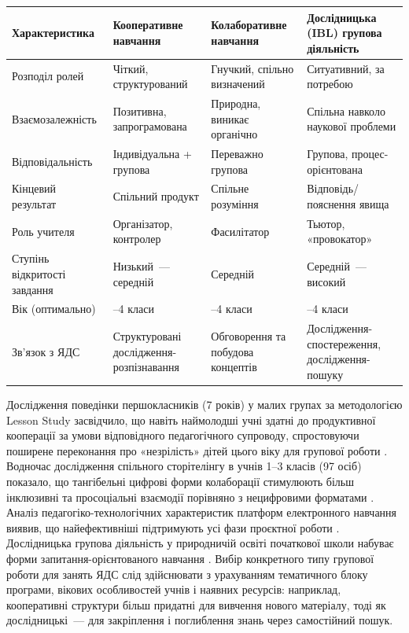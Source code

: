 \documentclass[a4paper,14pt]{extarticle}
\begin{document}
\begin{center}
\label{tab:2.1}
\begin{longtable}{|>{\raggedright\arraybackslash}p{2.8cm}|
                    >{\raggedright\arraybackslash}p{3cm}|
                    >{\raggedright\arraybackslash}p{3.2cm}|
                    >{\raggedright\arraybackslash}p{3.2cm}|}
\hline
\textbf{Характеристика} &
\textbf{Кооперативне навчання} &
\textbf{Колаборативне навчання} &
\textbf{Дослідницька (IBL) групова діяльність} \\
\hline
Розподіл ролей & Чіткий, структурований & Гнучкий, спільно визначений & Ситуативний, за потребою \\
\hline
Взаємозалежність & Позитивна, запрограмована & Природна, виникає органічно & Спільна навколо наукової проблеми \\
\hline
Відповідальність & Індивідуальна + групова & Переважно групова & Групова, процес-орієнтована \\
\hline
Кінцевий результат & Спільний продукт & Спільне розуміння & Відповідь/пояснення явища \\
\hline
Роль учителя & Організатор, контролер & Фасилітатор & Тьютор, «провокатор» \\
\hline
Ступінь відкри\-тості завдання & Низький~--- середній & Середній & Середній~--- високий \\
\hline
Вік (оптимально) & 1–4 класи & 3–4 класи & 2–4 класи \\
\hline
Зв'язок з ЯДС & Структуровані дослідження-розпізнавання & Обговорення та побудова концептів & Дослідження-спостереження, дослідження-пошуку \\
\hline
\end{longtable}
\end{center}

Дослідження поведінки першокласників (7 років) у малих групах за методологією Lesson Study засвідчило, що навіть наймолодші учні здатні до продуктивної кооперації за умови відповідного педагогічного супроводу, спростовуючи поширене переконання про «незрілість» дітей цього віку для групової роботи \parencite{Jakavonytė-Staškuvienė2025}. Водночас дослідження спільного сторітелінгу в учнів 1--3 класів (97 осіб) показало, що тангібельні цифрові форми колаборації стимулюють більш інклюзивні та просоціальні взаємодії порівняно з нецифровими форматами \parencite{Filosofi2025801}. Аналіз педагогіко-технологічних характеристик платформ електронного навчання виявив, що найефективніші підтримують усі фази проєктної роботи \parencite{Baziukė2025}. Дослідницька групова діяльність у природничій освіті початкової школи набуває форми запитання-орієнтованого навчання \parencite{Sakamoto2016105}. Вибір конкретного типу групової роботи для занять ЯДС слід здійснювати з урахуванням тематичного блоку програми, вікових особливостей учнів і наявних ресурсів: наприклад, кооперативні структури більш придатні для вивчення нового матеріалу, тоді як дослідницькі~--- для закріплення і поглиблення знань через самостійний пошук.
\end{document}
